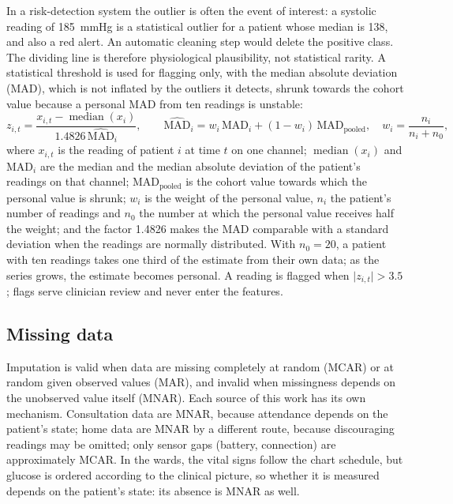 \documentclass[11pt,a4paper,oneside]{report}
\begin{document}
In a risk-detection system the outlier is often the event of interest: a systolic reading of 185~mmHg is a statistical outlier for a patient whose median is 138, and also a red alert. An automatic cleaning step would delete the positive class. The dividing line is therefore physiological plausibility, not statistical rarity. A statistical threshold is used for flagging only, with the median absolute deviation (MAD), which is not inflated by the outliers it detects, shrunk towards the cohort value because a personal MAD from ten readings is unstable:
\begin{equation}
  z_{i,t} = \frac{x_{i,t} - \operatorname{median}(x_i)}{1.4826\,\widehat{\mathrm{MAD}}_i}, \qquad
  \widehat{\mathrm{MAD}}_i = w_i\,\mathrm{MAD}_i + (1-w_i)\,\mathrm{MAD}_{\text{pooled}}, \quad w_i = \frac{n_i}{n_i + n_0},
\end{equation}
where $x_{i,t}$ is the reading of patient $i$ at time $t$ on one channel; $\operatorname{median}(x_i)$ and $\mathrm{MAD}_i$ are the median and the median absolute deviation of the patient's readings on that channel; $\mathrm{MAD}_{\text{pooled}}$ is the cohort value towards which the personal value is shrunk; $w_i$ is the weight of the personal value, $n_i$ the patient's number of readings and $n_0$ the number at which the personal value receives half the weight; and the factor 1.4826 makes the MAD comparable with a standard deviation when the readings are normally distributed. With $n_0 = 20$, a patient with ten readings takes one third of the estimate from their own data; as the series grows, the estimate becomes personal. A reading is flagged when $\lvert z_{i,t}\rvert > 3.5$ \parencite{iglewicz1993}; flags serve clinician review and never enter the features.

\subsection{Missing data}\label{sec:missingness}\label{sec:masking}\label{sec:mask-models}

Imputation is valid when data are missing completely at random (MCAR) or at random given observed values (MAR), and invalid when missingness depends on the unobserved value itself (MNAR). Each source of this work has its own mechanism. Consultation data are MNAR, because attendance depends on the patient's state; home data are MNAR by a different route, because discouraging readings may be omitted; only sensor gaps (battery, connection) are approximately MCAR. In the wards, the vital signs follow the chart schedule, but glucose is ordered according to the clinical picture, so whether it is measured depends on the patient's state: its absence is MNAR as well.
\end{document}
